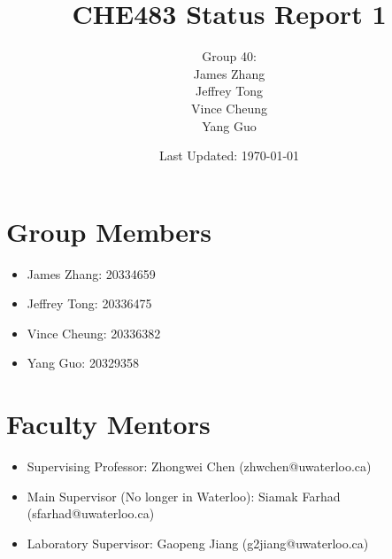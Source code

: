 \documentclass{article}
\begin{document}
	\title{CHE483 Status Report 1}
	\author{Group 40: \\James Zhang \\ Jeffrey Tong \\ Vince Cheung \\ Yang Guo }
	\date{Last Updated: \today}
	\maketitle
	\cleardoublepage
	\section{Group Members}
		\begin{itemize}
			\item	James Zhang: 20334659
			\item	Jeffrey Tong: 20336475
			\item	Vince Cheung: 20336382
			\item	Yang Guo: 20329358
		\end{itemize}
	\section{Faculty Mentors}
		\begin{itemize}
			\item Supervising Professor: Zhongwei Chen (zhwchen@uwaterloo.ca)
			\item Main Supervisor (No longer in Waterloo): Siamak Farhad (sfarhad@uwaterloo.ca)
			\item Laboratory Supervisor: Gaopeng Jiang (g2jiang@uwaterloo.ca)
		\end{itemize}
\end{document}
